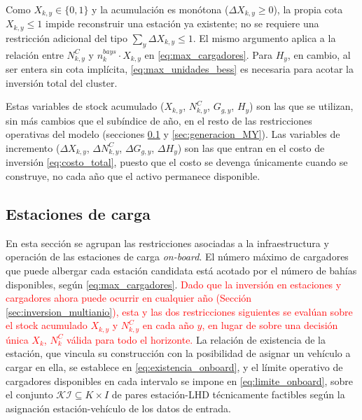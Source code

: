 \documentclass[11pt]{article}
\newcommand{\change}[1]{\textcolor{red}{#1}}
\begin{document}
\noindent Como $X_{k,y}\in\{0,1\}$ y la acumulación es monótona ($\Delta X_{k,y}\geq0$), la propia cota $X_{k,y}\leq1$ impide reconstruir una estación ya existente; no se requiere una restricción adicional del tipo $\sum_y\Delta X_{k,y}\leq1$. El mismo argumento aplica a la relación entre $N_{k,y}^C$ y $n_k^{bays}\cdot X_{k,y}$ en \eqref{eq:max_cargadores}. Para $H_y$, en cambio, al ser entera sin cota implícita, \eqref{eq:max_unidades_bess} es necesaria para acotar la inversión total del cluster.

Estas variables de stock acumulado ($X_{k,y}$, $N_{k,y}^C$, $G_{g,y}$, $H_y$) son las que se utilizan, sin más cambios que el subíndice de año, en el resto de las restricciones operativas del modelo (secciones \ref{sec:estaciones_MY} y \ref{sec:generacion_MY}). Las variables de incremento ($\Delta X_{k,y}$, $\Delta N_{k,y}^C$, $\Delta G_{g,y}$, $\Delta H_y$) son las que entran en el costo de inversión \eqref{eq:costo_total}, puesto que el costo se devenga únicamente cuando se construye, no cada año que el activo permanece disponible.
\endgroup

\subsection{Estaciones de carga}
\label{sec:estaciones_MY}

En esta sección se agrupan las restricciones asociadas a la infraestructura y operación de las estaciones de carga \textit{on-board}. El número máximo de cargadores que puede albergar cada estación candidata está acotado por el número de bahías disponibles, según \eqref{eq:max_cargadores}. \change{Dado que la inversión en estaciones y cargadores ahora puede ocurrir en cualquier año (Sección \ref{sec:inversion_multianio}), esta y las dos restricciones siguientes se evalúan sobre el stock acumulado $X_{k,y}$ y $N_{k,y}^C$ en cada año $y$, en lugar de sobre una decisión única $X_k$, $N_k^C$ válida para todo el horizonte.} La relación de existencia de la estación, que vincula su construcción con la posibilidad de asignar un vehículo a cargar en ella, se establece en \eqref{eq:existencia_onboard}, y el límite operativo de cargadores disponibles en cada intervalo se impone en \eqref{eq:limite_onboard}, sobre el conjunto $\mathcal{KI}\subseteq K\times I$ de pares estación-LHD técnicamente factibles según la asignación estación-vehículo de los datos de entrada.\\
\end{document}
